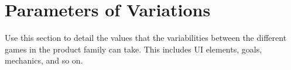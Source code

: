 \section{Parameters of Variations}

Use this section to detail the values that the variabilities between the different games in the product family can take. This includes UI elements, goals, mechanics, and so on.